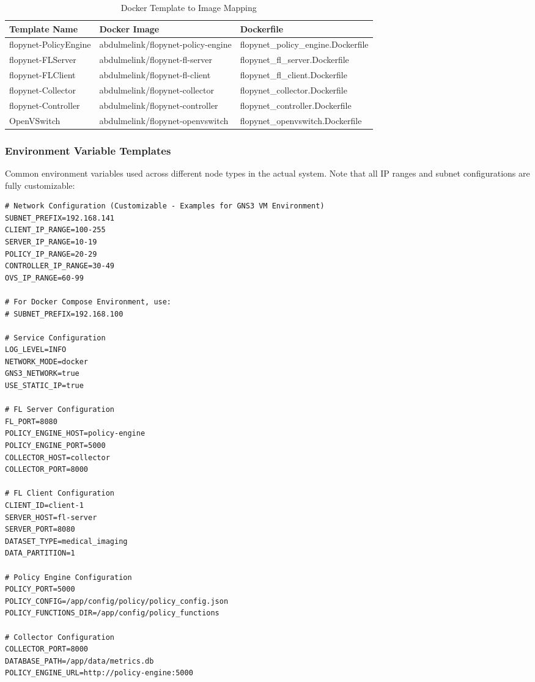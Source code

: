 \begin{table}[H]
\centering
\caption{Docker Template to Image Mapping}
\label{tab:docker-templates}
\begin{tabular}{@{}lll@{}}
\toprule
\textbf{Template Name} & \textbf{Docker Image} & \textbf{Dockerfile} \\
\midrule
flopynet-PolicyEngine & abdulmelink/flopynet-policy-engine & flopynet\_policy\_engine.Dockerfile \\
flopynet-FLServer & abdulmelink/flopynet-fl-server & flopynet\_fl\_server.Dockerfile \\
flopynet-FLClient & abdulmelink/flopynet-fl-client & flopynet\_fl\_client.Dockerfile \\
flopynet-Collector & abdulmelink/flopynet-collector & flopynet\_collector.Dockerfile \\
flopynet-Controller & abdulmelink/flopynet-controller & flopynet\_controller.Dockerfile \\
OpenVSwitch & abdulmelink/flopynet-openvswitch & flopynet\_openvswitch.Dockerfile \\
\bottomrule
\end{tabular}
\end{table}

\subsubsection{Environment Variable Templates}

Common environment variables used across different node types in the actual system. Note that all IP ranges and subnet configurations are fully customizable:

\begin{lstlisting}[style=bashcode, caption=Common Environment Variables]
# Network Configuration (Customizable - Examples for GNS3 VM Environment)
SUBNET_PREFIX=192.168.141
CLIENT_IP_RANGE=100-255
SERVER_IP_RANGE=10-19
POLICY_IP_RANGE=20-29
CONTROLLER_IP_RANGE=30-49
OVS_IP_RANGE=60-99

# For Docker Compose Environment, use:
# SUBNET_PREFIX=192.168.100

# Service Configuration
LOG_LEVEL=INFO
NETWORK_MODE=docker
GNS3_NETWORK=true
USE_STATIC_IP=true

# FL Server Configuration
FL_PORT=8080
POLICY_ENGINE_HOST=policy-engine
POLICY_ENGINE_PORT=5000
COLLECTOR_HOST=collector
COLLECTOR_PORT=8000

# FL Client Configuration
CLIENT_ID=client-1
SERVER_HOST=fl-server
SERVER_PORT=8080
DATASET_TYPE=medical_imaging
DATA_PARTITION=1

# Policy Engine Configuration
POLICY_PORT=5000
POLICY_CONFIG=/app/config/policy/policy_config.json
POLICY_FUNCTIONS_DIR=/app/config/policy_functions

# Collector Configuration
COLLECTOR_PORT=8000
DATABASE_PATH=/app/data/metrics.db
POLICY_ENGINE_URL=http://policy-engine:5000
\end{lstlisting}
